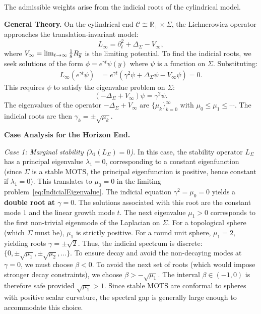 \begin{lemma}\label{lem:IndicialRoots}
The admissible weights arise from the indicial roots of the cylindrical model.

\textbf{General Theory.}
On the cylindrical end $\mathcal{C} \cong \mathbb{R}_+ \times \Sigma$, the Lichnerowicz operator approaches the translation-invariant model:
\[
    L_\infty = \partial_t^2 + \Delta_\Sigma - V_\infty,
\]
where $V_\infty = \lim_{t \to \infty} \frac{1}{8}R_{\overline{g}}$ is the limiting potential. To find the indicial roots, we seek solutions of the form $\phi = e^{\gamma t} \psi(y)$ where $\psi$ is a function on $\Sigma$. Substituting:
\begin{align*}
    L_\infty(e^{\gamma t} \psi) &= e^{\gamma t}(\gamma^2 \psi + \Delta_\Sigma \psi - V_\infty \psi) = 0.
\end{align*}
This requires $\psi$ to satisfy the eigenvalue problem on $\Sigma$:
\begin{equation}\label{eq:IndicialEigenvalue}
    (-\Delta_\Sigma + V_\infty)\psi = \gamma^2 \psi.
\end{equation}
The eigenvalues of the operator $-\Delta_\Sigma + V_\infty$ are $\{\mu_k\}_{k=0}^\infty$ with $\mu_0 \le \mu_1 \le \cdots$. The indicial roots are then $\gamma_k = \pm \sqrt{\mu_k}$.

\textbf{Case Analysis for the Horizon End.}

\textit{Case 1: Marginal stability ($\lambda_1(L_\Sigma)=0$).}
In this case, the stability operator $L_\Sigma$ has a principal eigenvalue $\lambda_1 = 0$, corresponding to a constant eigenfunction (since $\Sigma$ is a stable MOTS, the principal eigenfunction is positive, hence constant if $\lambda_1=0$). This translates to $\mu_0 = 0$ in the limiting problem~\eqref{eq:IndicialEigenvalue}. The indicial equation $\gamma^2 = \mu_0 = 0$ yields a \textbf{double root at $\gamma = 0$}.
The solutions associated with this root are the constant mode $1$ and the linear growth mode $t$.
The next eigenvalue $\mu_1 > 0$ corresponds to the first non-trivial eigenmode of the Laplacian on $\Sigma$. For a topological sphere (which $\Sigma$ must be), $\mu_1$ is strictly positive. For a round unit sphere, $\mu_1 = 2$, yielding roots $\gamma = \pm \sqrt{2}$.
Thus, the indicial spectrum is discrete: $\{0, \pm\sqrt{\mu_1}, \pm\sqrt{\mu_2}, \dots\}$.
To ensure decay and avoid the non-decaying modes at $\gamma=0$, we must choose $\beta < 0$. To avoid the next set of roots (which would impose stronger decay constraints), we choose $\beta > -\sqrt{\mu_1}$.
The interval $\beta \in (-1, 0)$ is therefore safe provided $\sqrt{\mu_1} > 1$. Since stable MOTS are conformal to spheres with positive scalar curvature, the spectral gap is generally large enough to accommodate this choice.


\end{lemma}
